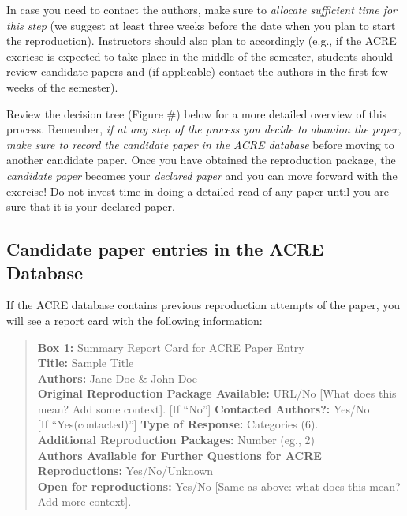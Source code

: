 \documentclass[]{book}
\begin{document}
In case you need to contact the authors, make sure to \emph{allocate sufficient time for this step} (we suggest at least three weeks before the date when you plan to start the reproduction). Instructors should also plan to accordingly (e.g., if the ACRE exericse is expected to take place in the middle of the semester, students should review candidate papers and (if applicable) contact the authors in the first few weeks of the semester).

Review the decision tree (Figure \#) below for a more detailed overview of this process. Remember, \emph{if at any step of the process you decide to abandon the paper, make sure to record the candidate paper in the ACRE database} before moving to another candidate paper. Once you have obtained the reproduction package, the \emph{candidate paper} becomes your \emph{declared paper} and you can move forward with the exercise! Do not invest time in doing a detailed read of any paper until you are sure that it is your declared paper.

\hypertarget{candidate-paper-entries-in-the-acre-database}{%
\subsection{Candidate paper entries in the ACRE Database}\label{candidate-paper-entries-in-the-acre-database}}

If the ACRE database contains previous reproduction attempts of the paper, you will see a report card with the following information:

\begin{quote}
\textbf{Box 1:} Summary Report Card for ACRE Paper Entry\\
\textbf{Title:} Sample Title\\
\textbf{Authors:} Jane Doe \& John Doe\\
\textbf{Original Reproduction Package Available:} URL/No {[}What does this mean? Add some context{]}.
{[}If ``No''{]} \textbf{Contacted Authors?:} Yes/No\\
{[}If ``Yes(contacted)''{]} \textbf{Type of Response:} Categories (6).\\
\textbf{Additional Reproduction Packages:} Number (eg., 2)\\
\textbf{Authors Available for Further Questions for ACRE Reproductions:} Yes/No/Unknown\\
\textbf{Open for reproductions:} Yes/No {[}Same as above: what does this mean? Add more context{]}.
\end{quote}
\end{document}
